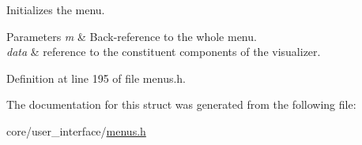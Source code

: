 Initializes the menu. 


\begin{DoxyParams}{Parameters}
{\em m} & Back-\/reference to the whole menu. \\
\hline
{\em data} & reference to the constituent components of the visualizer. \\
\hline
\end{DoxyParams}


Definition at line 195 of file menus.\+h.



The documentation for this struct was generated from the following file\+:\begin{DoxyCompactItemize}
\item 
core/user\+\_\+interface/\hyperlink{menus_8h}{menus.\+h}\end{DoxyCompactItemize}
